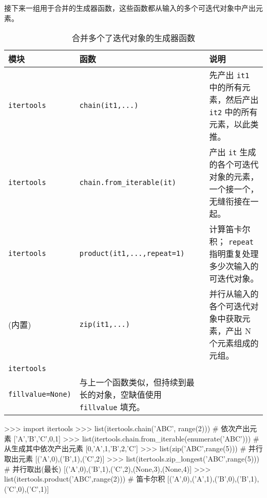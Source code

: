 接下来一组用于合并的生成器函数，这些函数都从输入的多个可迭代对象中产出元素。
\begin{table}[H]
    \centering
    \caption{合并多个了迭代对象的生成器函数}
    \label{table:合并多个了迭代对象的生成器函数}
    \setlength{\tabcolsep}{2mm}
    \small
    \begin{tabular}{l|l|p{9cm}}
        \toprule
        \textbf{模块} & \textbf{函数} & \textbf{说明} \\
        \midrule
        \texttt{itertools} & \texttt{chain(it1,...)} & 先产出 \texttt{it1} 中的所有元素，然后产出 \texttt{it2} 中的所有元素，以此类推。 \\
        \midrule
        \texttt{itertools} & \texttt{chain.from\_iterable(it)} & 产出 \texttt{it} 生成的各个可迭代对象的元素，一个接一个，无缝衔接在一起。  \\
        \midrule
        \texttt{itertools} & \texttt{product(it1,...,repeat=1)} & 计算笛卡尔积； \texttt{repeat} 指明重复处理多少次输入的可迭代对象。  \\
        \midrule
        (内置) & \texttt{zip(it1,...)} & 并行从输入的各个可迭代对象中获取元素，产出 N 个元素组成的元组。  \\
        \midrule
        \texttt{itertools} & \tabincell{c}{\texttt{zip\_longest(it1,...,}\\\texttt{fillvalue=None)}} & 与上一个函数类似，但持续到最长的对象，空缺值使用 \texttt{fillvalue} 填充。  \\
        \bottomrule
    \end{tabular}
\end{table}

\begin{python}
>>> import itertools
>>> list(itertools.chain('ABC', range(2)))  # 依次产出元素
['A','B','C',0,1]
>>> list(itertools.chain.from_iterable(enumerate('ABC')))   # 从生成其中依次产出元素
[0,'A',1,'B',2,'C']
>>> list(zip('ABC',range(5)))   # 并行取出元素
[('A',0),('B',1),('C',2)]
>>> list(itertools.zip_longest('ABC',range(5)))     # 并行取出(最长)
[('A',0),('B',1),('C',2),(None,3),(None,4)]
>>> list(itertools.product('ABC',range(2)))     # 笛卡尔积
[('A',0),('A',1),('B',0),('B',1),('C',0),('C',1)]
\end{python}

